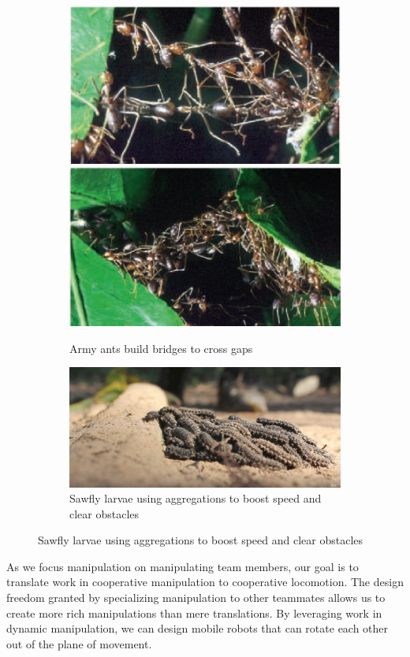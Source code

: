 \documentclass[letterpaper, 10 pt, conference]{ieeeconf}
\begin{document}
\begin{figure}[ht]
  \centering
  \begin{subfigure}[t]{0.8\columnwidth}
    \centering
    \includegraphics[width=.5\linewidth,height=.3\columnwidth]{AndersonAntBridgeL.png}%
    \includegraphics[width=.5\linewidth,height=.3\columnwidth]{AndersonAntBridgeM.png}\\
    \caption{Army ants build bridges to cross gaps \cite{Anderson2002}}
  \end{subfigure}

  \begin{subfigure}[t]{0.8\columnwidth}
    \centering
    \includegraphics[width=\linewidth]{SawflyLarvaeClimb.png}
    \caption{Sawfly larvae using aggregations to boost speed and clear obstacles \cite{SEDSawflyCluster}}
  \end{subfigure}
\end{figure}

As we focus manipulation on manipulating team members, our goal is to translate work in cooperative manipulation to cooperative locomotion.
The design freedom granted by specializing manipulation to other teammates allows us to create more rich manipulations than mere translations.
By leveraging work in dynamic manipulation, we can design mobile robots that can rotate each other out of the plane of movement.
\end{document}
